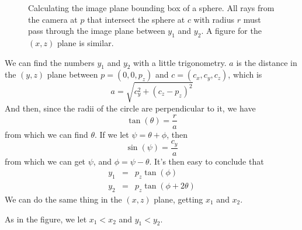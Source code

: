 \documentclass{article}
\newcommand{\mydot}[1]{\draw[fill] (#1) circle (0.1);}
\begin{document}
\begin{description}
\begin{description}
  \begin{figure}
    \begin{center}
    \end{center}
    \caption{Calculating the image plane bounding box of a sphere.
      All rays from 
      the camera at $p$ that intersect the sphere at $c$ with radius
      $r$ must pass through the image plane between $y_1$ and $y_2$.
      A figure for the $(x,z)$ plane is similar.}
    \label{spherebox}
    
  \end{figure}

We can find the numbers $y_1$ and $y_2$ with a little trigonometry.
$a$ is the distance in the $(y,z)$ plane between $p=(0,0,p_z)$ and $c =
(c_x,c_y,c_z)$, 
which is
\[
a = \sqrt{c_y^2 + (c_z - p_z)^2}
\]
And then, since the radii of the circle are perpendicular to it, we
have
\[
\tan(\theta) = \frac{r}{a}
\]
from which we can find $\theta$.  If we let $\psi = \theta+\phi$, then
\[
\sin(\psi) = \frac{c_y}{a}
\]
from which we can get $\psi$, and $\phi = \psi - \theta$.  It's then
easy to conclude that
\begin{eqnarray*}
  y_1 &=& p_z \tan(\phi)\\
  y_2 &=& p_z \tan(\phi + 2\theta)
\end{eqnarray*}
We can do the same thing in the $(x,z)$ plane, getting $x_1$ and $x_2$.

As in the figure, we let $x_1 < x_2$ and $y_1 < y_2$.


\end{description}
\end{description}
\end{document}
